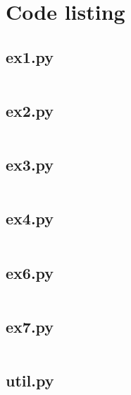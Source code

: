 \documentclass[10pt,a4paper,oneside,onecolumn]{article}
\begin{document}
\onecolumn
\appendixpage
\appendix

\section{Code listing}

\subsection{ex1.py}\label{app:ex1}
\inputminted{python}{../src/ex1.py}
\newpage

\subsection{ex2.py}\label{app:ex2}
\inputminted{python}{../src/ex2.py}
\newpage

\subsection{ex3.py}\label{app:ex3}
\inputminted{python}{../src/ex3.py}
\newpage

\subsection{ex4.py}\label{app:ex4}
\inputminted{python}{../src/ex4.py}
\newpage

\subsection{ex6.py}\label{app:ex6}
\inputminted{python}{../src/ex6.py}
\newpage

\subsection{ex7.py}\label{app:ex7}
\inputminted{python}{../src/ex7.py}
\newpage

\subsection{util.py}\label{app:util}
\inputminted{python}{../src/util.py}
\end{document}
